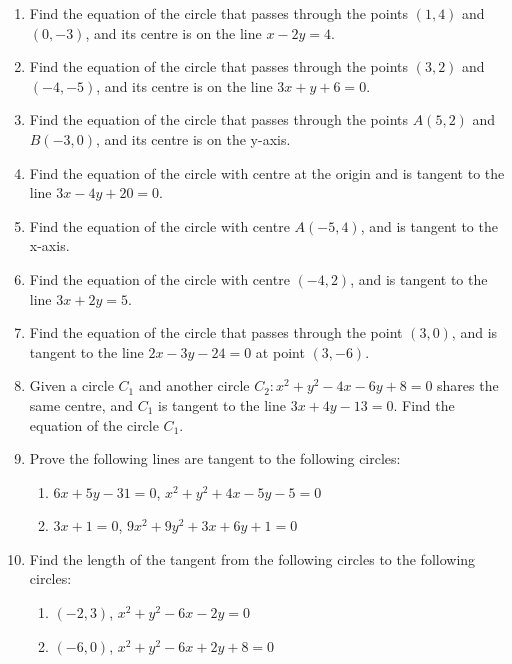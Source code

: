 \documentclass{report}
\begin{document}
\begin{multicols}{2}
      \begin{enumerate}
            \item Find the equation of the circle that passes through the points $(1, 4)$ and
                  $(0, -3)$, and its centre is on the line $x - 2y = 4$.
            \item Find the equation of the circle that passes through the points $(3, 2)$ and
                  $(-4, -5)$, and its centre is on the line $3x + y + 6 = 0$.
            \item Find the equation of the circle that passes through the points $A(5, 2)$ and
                  $B(-3, 0)$, and its centre is on the y-axis.
            \item Find the equation of the circle with centre at the origin and is tangent to the
                  line $3x - 4y + 20 = 0$.
            \item Find the equation of the circle with centre $A(-5, 4)$, and is tangent to the
                  x-axis.
            \item Find the equation of the circle with centre $(-4, 2)$, and is tangent to the
                  line $3x + 2y = 5$.
            \item Find the equation of the circle that passes through the point $(3, 0)$, and is
                  tangent to the line $2x - 3y - 24 = 0$ at point $(3, -6)$.
            \item Given a circle $C_1$ and another circle $C_2: x^2 + y^2 - 4x - 6y + 8 = 0$
                  shares the same centre, and $C_1$ is tangent to the line $3x + 4y - 13 = 0$.
                  Find the equation of the circle $C_1$.
            \item Prove the following lines are tangent to the following circles:
                  \begin{enumerate}
                        \item $6x + 5y - 31 = 0$, $x^2 + y^2 + 4x - 5y - 5 = 0$
                        \item $3x + 1 = 0$, $9x^2 + 9y^2 + 3x + 6y + 1 = 0$
                  \end{enumerate}
            \item Find the length of the tangent from the following circles to the following
                  circles:
                  \begin{enumerate}
                        \item $(-2, 3)$, $x^2 + y^2 - 6x - 2y = 0$
                        \item $(-6, 0)$, $x^2 + y^2 - 6x + 2y + 8 = 0$

\end{enumerate}
\end{enumerate}
\end{multicols}
\end{document}

